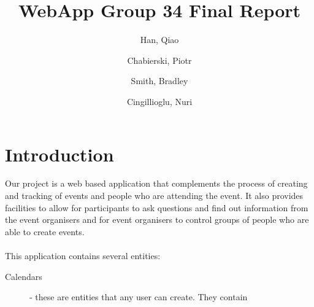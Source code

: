 \documentclass[10pt,a4paper]{article}
\begin{document}
\title{WebApp Group 34 Final Report}
\author{
  Han, Qiao\\
  \and
  Chabierski, Piotr\\
  \and
  Smith, Bradley\\
  \and
  Cingillioglu, Nuri\\
}

\maketitle

\section{Introduction}
Our project is a web based application that complements the process of creating and tracking of events and people who are attending the event. It also provides facilities to allow for participants to ask questions and find out information from the event organisers and for event organisers to control groups of people who are able to create events. 
\\
\\
\noindent This application contains several entities:
\begin{description}
\item[Calendars] - these are entities that any user can create. They contain   
\end{description}

\section{}
\end{document}
